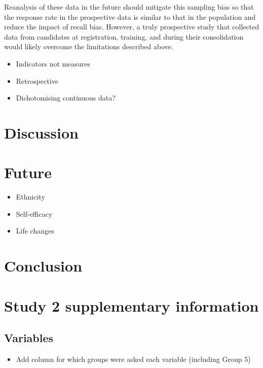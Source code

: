 \documentclass[a4paper,]{book}
\providecommand{\tightlist}{%
  \setlength{\itemsep}{0pt}\setlength{\parskip}{0pt}}
\begin{document}
Reanalysis of these data in the future should mitigate this sampling bias so that the response rate in the prospective data is similar to that in the population and reduce the impact of recall bias. However, a truly prospective study that collected data from candidates at registration, training, and during their consolidation would likely overcome the limitations described above.

\begin{itemize}
\tightlist
\item
  Indicators not measures
\item
  Retrospective
\item
  Dichotomising continuous data?
\end{itemize}

\hypertarget{discussion-2}{%
\section{Discussion}\label{discussion-2}}

\hypertarget{future}{%
\section{Future}\label{future}}

\begin{itemize}
\tightlist
\item
  Ethnicity
\item
  Self-efficacy
\item
  Life changes
\end{itemize}

\hypertarget{conclusion}{%
\section{Conclusion}\label{conclusion}}

\hypertarget{study-2-supplementary-information}{%
\section{Study 2 supplementary information}\label{study-2-supplementary-information}}

\hypertarget{variables}{%
\subsection{Variables}\label{variables}}

\begin{itemize}
\tightlist
\item
  Add column for which groups were asked each variable (including Group 5)
\end{itemize}
\end{document}
